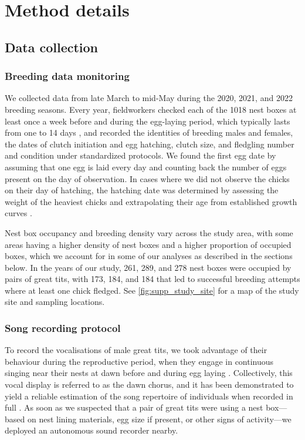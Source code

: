 \documentclass[9pt, onecolumn, twoside, lineno]{gsajnl}
\begin{document}
\section{Method details}
\label{sc:methods}

\subsection{Data collection}

\subsubsection{Breeding data monitoring}
We collected data from late March to mid-May during the 2020, 2021, and 2022 breeding seasons. Every year, fieldworkers checked each of the 1018 nest boxes at least once a week before and during the egg-laying period, which typically lasts from one to 14 days \autocite{Perrins1965}, and recorded the identities of breeding males and females, the dates of clutch initiation and egg hatching, clutch size, and fledgling number and condition under standardized protocols. We found the first egg date by assuming that one egg is laid every day and counting back the number of eggs present on the day of observation. In cases where we did not observe the chicks on their day of hatching, the hatching date was determined by assessing the weight of the heaviest chicks and extrapolating their age from established growth curves \autocite{cresswell2003, gibb1950}.

Nest box occupancy and breeding density vary across the study area, with some areas having a higher density of nest boxes and a higher proportion of occupied boxes, which we account for in some of our analyses as described in the sections below. In the years of our study, 261, 289, and 278 nest boxes were occupied by pairs of great tits, with 173, 184, and 184 that led to successful breeding attempts where at least one chick fledged. See \autoref{fig:supp_study_site} for a map of the study site and sampling locations.

\subsubsection{Song recording protocol}

To record the vocalisations of male great tits, we took advantage of their behaviour during the reproductive period, when they engage in continuous singing near their nests at dawn before and during egg laying \autocite{mace1987}. Collectively, this vocal display is referred to as the dawn chorus, and it has been demonstrated to yield a reliable estimation of the song repertoire of individuals when recorded in full \autocite{rivera-gutierrez2012, vanduyse2005}. As soon as we suspected that a pair of great tits were using a nest box---based on nest lining materials, egg size if present, or other signs of activity---we deployed an autonomous sound recorder nearby.
\end{document}
